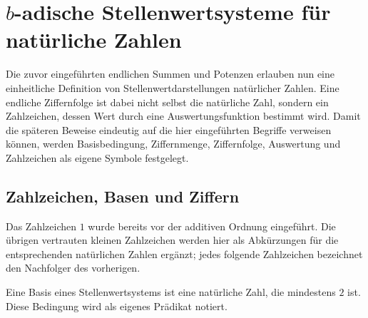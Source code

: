 \documentclass[main.tex]{subfiles}
\begin{document}
\chapter{\(b\)-adische Stellenwertsysteme für natürliche Zahlen}

Die zuvor eingeführten endlichen Summen und Potenzen erlauben nun eine
einheitliche Definition von Stellenwertdarstellungen natürlicher Zahlen. Eine
endliche Ziffernfolge ist dabei nicht selbst die natürliche Zahl, sondern ein
Zahlzeichen, dessen Wert durch eine Auswertungsfunktion bestimmt wird. Damit
die späteren Beweise eindeutig auf die hier eingeführten Begriffe verweisen
können, werden Basisbedingung, Ziffernmenge, Ziffernfolge, Auswertung und
Zahlzeichen als eigene Symbole festgelegt.

\section{Zahlzeichen, Basen und Ziffern}

Das Zahlzeichen \(1\) wurde bereits vor der additiven Ordnung eingeführt.
Die übrigen vertrauten kleinen Zahlzeichen werden hier als Abkürzungen für
die entsprechenden natürlichen Zahlen ergänzt; jedes folgende Zahlzeichen
bezeichnet den Nachfolger des vorherigen.


Eine Basis eines Stellenwertsystems ist eine natürliche Zahl, die mindestens
\(2\) ist. Diese Bedingung wird als eigenes Prädikat notiert.


\begin{tabproof}
\end{tabproof}
\end{document}
